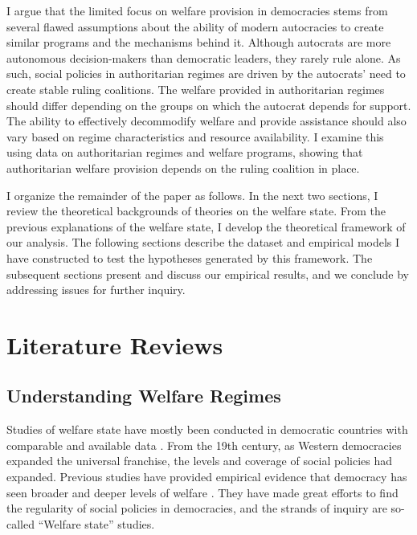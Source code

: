 \documentclass[11pt, notitlepage]{article}
\begin{document}
I argue that the limited focus on welfare provision in democracies stems from several flawed assumptions about the ability of modern autocracies to create similar programs and the mechanisms behind it. Although autocrats are more autonomous decision-makers than democratic leaders, they rarely rule alone. As such, social policies in authoritarian regimes are driven by the autocrats’ need to create stable ruling coalitions. The welfare provided in authoritarian regimes should differ depending on the groups on which the autocrat depends for support. The ability to effectively decommodify welfare and provide assistance should also vary based on regime characteristics and resource availability. I examine this using data on authoritarian regimes and welfare programs, showing that authoritarian welfare provision depends on the ruling coalition in place.\par

I organize the remainder of the paper as follows. In the next two sections, I review the theoretical backgrounds of theories on the welfare state. From the previous explanations of the welfare state, I develop the theoretical framework of our analysis. The following sections describe the dataset and empirical models I have constructed to test the hypotheses generated by this framework. The subsequent sections present and discuss our empirical results, and we conclude by addressing issues for further inquiry.

\section{Literature Reviews} 
\subsection{Understanding Welfare Regimes} 
Studies of welfare state have mostly been conducted in democratic countries with comparable and available data \citep{Jessop1984, Gosta1989, Gosta1990, Rudra2005, Huber2008, Hudson2009}. From the 19th century, as Western democracies expanded the universal franchise, the levels and coverage of social policies had expanded. Previous studies have provided empirical evidence that democracy has seen broader and deeper levels of welfare \citep{Acemoglu2000, Lindert2005}. They have made great efforts to find the regularity of social policies in democracies, and the strands of inquiry are so-called ``Welfare state'' studies.\par
\end{document}

